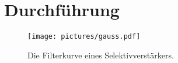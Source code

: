 \section{Durchführung}
\label{sec:Durchführung}

\begin{figure}[H]
    \centering
    \texttt{[image: pictures/gauss.pdf]}
    \caption{Die Filterkurve eines Selektivverstärkers. \cite{v606}}
    \label{fig:gauss}
\end{figure}
